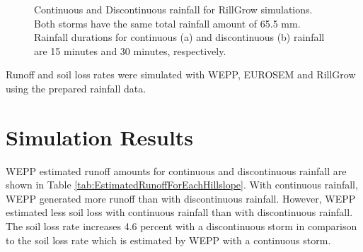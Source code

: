 \begin{figure}[htpb]
  \centering
  \caption{Continuous and Discontinuous rainfall for RillGrow simulations. Both
storms have the same total rainfall amount of 65.5 mm. Rainfall durations for
continuous (a) and discontinuous (b) rainfall are 15 minutes and 30 minutes,
respectively.}
  \label{fig:rg2_input_continuous}
\end{figure}

Runoff and soil loss rates were simulated with WEPP, EUROSEM and RillGrow using
the prepared rainfall data.

\section{Simulation Results}
\label{sec:InterStormGapsSimulatedResults}

WEPP estimated runoff amounts for continuous and discontinuous rainfall are
shown in Table \ref{tab:EstimatedRunoffForEachHillslope}. With continuous
rainfall, WEPP generated more runoff than with discontinuous rainfall. However,
WEPP estimated less soil loss with continuous rainfall than with discontinuous
rainfall. The soil loss rate increases 4.6 percent with a discontinuous storm in
comparison to the soil loss rate which is estimated by WEPP with a continuous
storm.

